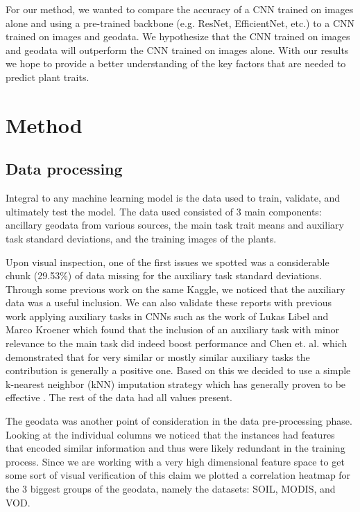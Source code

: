 \documentclass[12pt,a4paper,oneside]{article}
\begin{document}
\smallskip
For our method, we wanted to compare the accuracy of a CNN trained on images alone and using a pre-trained backbone (e.g. ResNet, EfficientNet, etc.) to a CNN trained on images and geodata. We hypothesize that the CNN trained on images and geodata will outperform the CNN trained on images alone. With our results we hope to provide a better understanding of the key factors that are needed to predict plant traits.


\section{Method}

\subsection{Data processing}

Integral to any machine learning model is the data used to train, validate, and ultimately test the model. The data used consisted of 3 main components: ancillary geodata from various sources, the main task trait means and auxiliary task standard deviations, and the training images of the plants.

\smallskip 
Upon visual inspection, one of the first issues we spotted was a considerable chunk (29.53\%) of data missing for the auxiliary task standard deviations. Through some previous work on the same Kaggle, we noticed that the auxiliary data was a useful inclusion. We can also validate these reports with previous work applying auxiliary tasks in CNNs such as the work of Lukas Libel and Marco Kroener which found that the inclusion of an auxiliary task with minor relevance to the main task did indeed boost performance \cite{lukaslibel} and Chen et. al. \cite{pmlr-v80-chen18a} which demonstrated that for very similar or mostly similar auxiliary tasks the contribution is generally a positive one. Based on this we decided to use a simple k-nearest neighbor (kNN) imputation strategy which has generally proven to be effective \cite{joel2024performance}. The rest of the data had all values present.

\smallskip
The geodata was another point of consideration in the data pre-processing phase. Looking at the individual columns we noticed that the instances had features that encoded similar information and thus were likely redundant in the training process. Since we are working with a very high dimensional feature space to get some sort of visual verification of this claim we plotted a correlation heatmap for the 3 biggest groups of the geodata, namely the datasets: SOIL, MODIS, and VOD.
\end{document}
